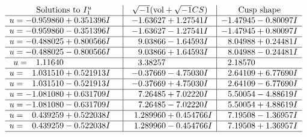 \documentclass[1p]{elsarticle_modified}
\theoremstyle{definition}
\newcommand{\I}{\sqrt{-1}}
\begin{document}
$$\begin{array}{c|c|c}  
\text{Solutions to }I^u_{1}& \I (\text{vol} + \sqrt{-1}CS) & \text{Cusp shape}\\
 \hline 
\begin{aligned}
u &= -0.959860 + 0.351396 I\end{aligned}
 & -1.63627 + 1.27541 I & -1.47945 - 0.80097 I \\ \hline\begin{aligned}
u &= -0.959860 - 0.351396 I\end{aligned}
 & -1.63627 - 1.27541 I & -1.47945 + 0.80097 I \\ \hline\begin{aligned}
u &= -0.488025 + 0.800566 I\end{aligned}
 & \phantom{-}9.03866 - 1.64593 I & \phantom{-}8.04988 + 0.24481 I \\ \hline\begin{aligned}
u &= -0.488025 - 0.800566 I\end{aligned}
 & \phantom{-}9.03866 + 1.64593 I & \phantom{-}8.04988 - 0.24481 I \\ \hline\begin{aligned}
u &= \phantom{-}1.11640\phantom{ +0.000000I}\end{aligned}
 & \phantom{-}3.38257\phantom{ +0.000000I} & \phantom{-}2.18570\phantom{ +0.000000I} \\ \hline\begin{aligned}
u &= \phantom{-}1.031510 + 0.521913 I\end{aligned}
 & -0.37669 - 4.75030 I & \phantom{-}2.64109 + 6.77690 I \\ \hline\begin{aligned}
u &= \phantom{-}1.031510 - 0.521913 I\end{aligned}
 & -0.37669 + 4.75030 I & \phantom{-}2.64109 - 6.77690 I \\ \hline\begin{aligned}
u &= -1.081080 + 0.631709 I\end{aligned}
 & \phantom{-}7.26485 + 7.02220 I & \phantom{-}5.50054 - 4.88619 I \\ \hline\begin{aligned}
u &= -1.081080 - 0.631709 I\end{aligned}
 & \phantom{-}7.26485 - 7.02220 I & \phantom{-}5.50054 + 4.88619 I \\ \hline\begin{aligned}
u &= \phantom{-}0.439259 + 0.522038 I\end{aligned}
 & \phantom{-}1.289960 + 0.454766 I & \phantom{-}7.19508 - 1.36957 I \\ \hline\begin{aligned}
u &= \phantom{-}0.439259 - 0.522038 I\end{aligned}
 & \phantom{-}1.289960 - 0.454766 I & \phantom{-}7.19508 + 1.36957 I\\
 \hline 
 \end{array}$$\newpage
\end{document}
